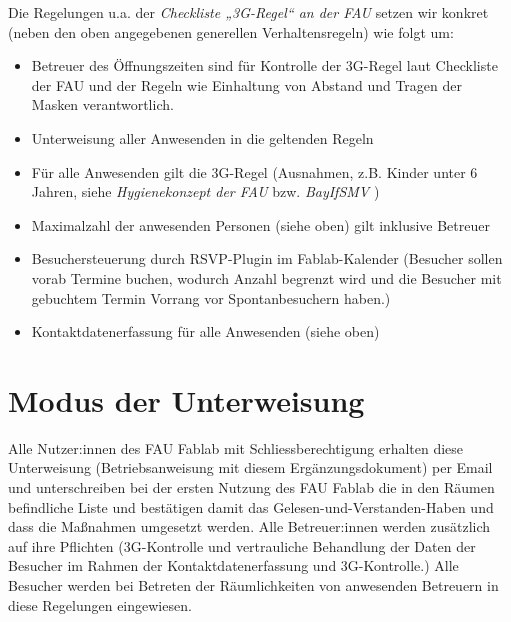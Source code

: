 \documentclass[13pt]{\basedir/fablab-document}
\begin{document}
Die Regelungen u.a. der \emph{Checkliste „3G-Regel“ an der FAU} setzen wir konkret (neben den oben angegebenen generellen Verhaltensregeln) wie folgt um:
\begin{itemize}
  \item  Betreuer des Öffnungszeiten sind für Kontrolle der 3G-Regel laut Checkliste der FAU und der Regeln wie Einhaltung von Abstand und Tragen der Masken verantwortlich.
  \item  Unterweisung aller Anwesenden in die geltenden Regeln
  \item  Für alle Anwesenden gilt die 3G-Regel (Ausnahmen, z.B. Kinder unter 6 Jahren, siehe \emph{Hygienekonzept der FAU} bzw. \emph{BayIfSMV} )
  \item  Maximalzahl der anwesenden Personen (siehe oben) gilt inklusive Betreuer
  \item  Besuchersteuerung durch RSVP-Plugin im Fablab-Kalender (Besucher sollen vorab Termine buchen, wodurch Anzahl begrenzt wird und die Besucher mit gebuchtem Termin Vorrang vor Spontanbesuchern haben.)
  \item  Kontaktdatenerfassung für alle Anwesenden (siehe oben)
\end{itemize}



\section{Modus der Unterweisung}
Alle Nutzer:innen des FAU Fablab mit Schliessberechtigung erhalten diese Unterweisung (Betriebsanweisung mit diesem Ergänzungsdokument) per Email und unterschreiben bei der ersten Nutzung des FAU Fablab die in den Räumen befindliche Liste und bestätigen damit das Gelesen-und-Verstanden-Haben und dass die Maßnahmen umgesetzt werden.
Alle Betreuer:innen werden zusätzlich auf ihre Pflichten (3G-Kontrolle und vertrauliche Behandlung der Daten der Besucher im Rahmen der Kontaktdatenerfassung und 3G-Kontrolle.)
Alle Besucher werden bei Betreten der Räumlichkeiten von anwesenden Betreuern in diese Regelungen eingewiesen.

\end{document}
